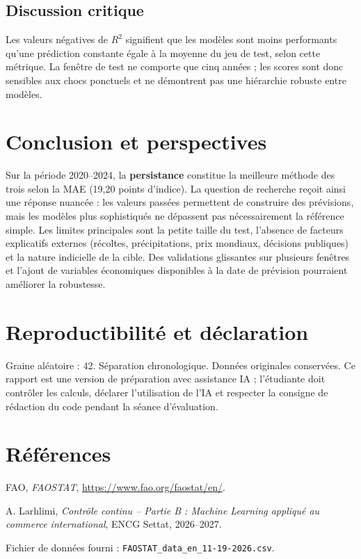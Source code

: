 \documentclass[11pt,a4paper]{report}
\begin{document}
\section{Discussion critique}
Les valeurs négatives de $R^2$ signifient que les modèles sont moins performants qu'une prédiction constante égale à la moyenne du jeu de test, selon cette métrique. La fenêtre de test ne comporte que cinq années ; les scores sont donc sensibles aux chocs ponctuels et ne démontrent pas une hiérarchie robuste entre modèles.
\chapter{Conclusion et perspectives}
Sur la période 2020--2024, la \textbf{persistance} constitue la meilleure méthode des trois selon la MAE (19,20 points d'indice). La question de recherche reçoit ainsi une réponse nuancée : les valeurs passées permettent de construire des prévisions, mais les modèles plus sophistiqués ne dépassent pas nécessairement la référence simple.
Les limites principales sont la petite taille du test, l'absence de facteurs explicatifs externes (récoltes, précipitations, prix mondiaux, décisions publiques) et la nature indicielle de la cible. Des validations glissantes sur plusieurs fenêtres et l'ajout de variables économiques disponibles à la date de prévision pourraient améliorer la robustesse.
\chapter*{Reproductibilité et déclaration}
Graine aléatoire : 42. Séparation chronologique. Données originales conservées. Ce rapport est une version de préparation avec assistance IA ; l'étudiante doit contrôler les calculs, déclarer l'utilisation de l'IA et respecter la consigne de rédaction du code pendant la séance d'évaluation.
\chapter*{Références}
\begin{enumerate}[label={[\arabic*]}]\item FAO, \emph{FAOSTAT}, \url{https://www.fao.org/faostat/en/}.\item A. Larhlimi, \emph{Contrôle continu -- Partie B : Machine Learning appliqué au commerce international}, ENCG Settat, 2026--2027.\item Fichier de données fourni : \texttt{FAOSTAT\_data\_en\_11-19-2026.csv}.\end{enumerate}
\end{document}
